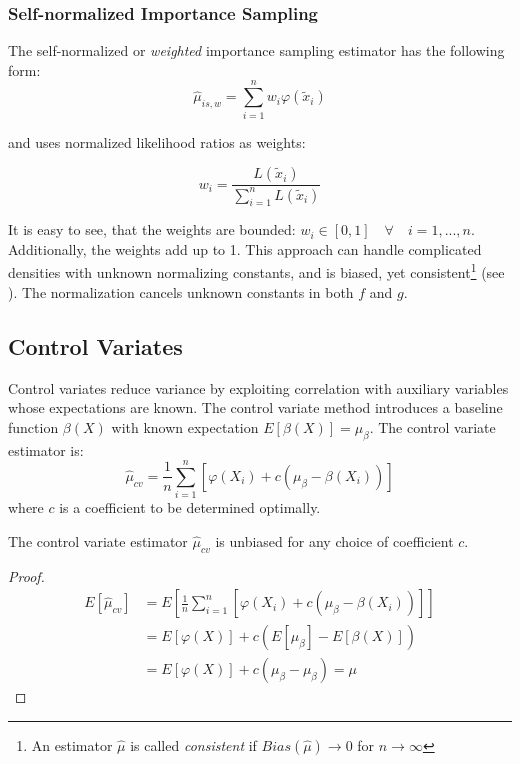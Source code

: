 \subsubsection{Self-normalized Importance Sampling}

The self-normalized or \textit{weighted} importance sampling estimator has the following form:
\begin{equation}
\hat{\mu}_{is,w} = \sum_{i=1}^n w_i\varphi(\tilde{x}_i) 
\end{equation}

and uses normalized likelihood ratios as weights:

\begin{equation*}
w_i = \frac{L(\tilde{x}_i)}{\sum_{i=1}^n L(\tilde{x}_i)}
\end{equation*}

It is easy to see, that the weights are bounded: $w_i \in [0, 1] \quad \forall \quad i=1,...,n$. Additionally, the weights add up to 1. This approach can handle complicated densities with unknown normalizing constants, and is biased, yet consistent\footnote{An estimator $\hat{\mu}$ is called \textit{consistent} if $Bias(\hat{\mu}) \to 0$ for $n \to \infty$} (see \cite{lemieux_monte_2009, murphy_probabilistic_2023}). The normalization cancels unknown constants in both $f$ and $g$.

\subsection{Control Variates}
\label{control_variates}

Control variates reduce variance by exploiting correlation with auxiliary variables whose expectations are known. The control variate method introduces a baseline function $\beta(X)$ with known expectation $E[\beta(X)] = \mu_\beta$. The control variate estimator is:
\begin{equation}
\hat{\mu}_{cv} = \frac{1}{n}\sum_{i=1}^n [\varphi(X_i) + c(\mu_\beta - \beta(X_i))]
\end{equation}
where $c$ is a coefficient to be determined optimally.

\begin{theoremrep}
The control variate estimator $\hat{\mu}_{cv}$ is unbiased for any choice of coefficient $c$.
\end{theoremrep}

\begin{proof}
\begin{align*}
E[\hat{\mu}_{cv}] &= E\left[\frac{1}{n}\sum_{i=1}^n [\varphi(X_i) + c(\mu_\beta - \beta(X_i))]\right]\\
&= E[\varphi(X)] + c(E[\mu_\beta] - E[\beta(X)])\\
&= E[\varphi(X)] + c(\mu_\beta - \mu_\beta) = \mu
\end{align*}
\end{proof}

